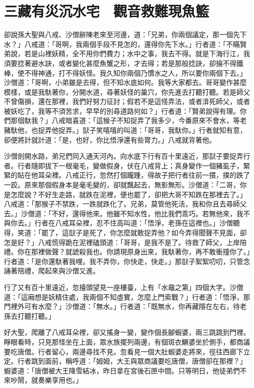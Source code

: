 
\chapter{三藏有災沉水宅　觀音救難現魚籃}

卻說孫大聖與八戒、沙僧辭陳老來至河邊，道：「兄弟，你兩個議定，那一個先下水？」八戒道：「哥啊，我兩個手段不見怎的，還得你先下水。」行者道：「不瞞賢弟說，若是山裡妖精，全不用你們費力；水中之事，我去不得。就是下海行江，我須要捻著避水訣，或者變化甚麼魚蟹之形，才去得；若是那般捻訣，卻掄不得鐵棒，使不得神通，打不得妖怪。我久知你兩個乃慣水之人，所以要你兩個下去。」沙僧道：「哥啊，小弟雖是去得，但不知水底如何。我等大家都去。哥哥變作甚麼模樣，或是我馱著你，分開水道，尋著妖怪的巢穴，你先進去打聽打聽。若是師父不曾傷損，還在那裡，我們好努力征討；假若不是這怪弄法，或者渰死師父，或者被妖吃了，我等不須苦求，早早的別尋道路何如？」行者道：「賢弟說得有理。你們那個馱我？」八戒暗喜道：「這猴子不知捉弄了我多少，今番原來不會水，等老豬馱他，也捉弄他捉弄。」獃子笑嘻嘻的叫道：「哥哥，我馱你。」行者就知有意，卻便將計就計道：「是，也好，你比悟淨還有些膂力。」八戒就背著他。

沙僧剖開水路，弟兄們同入通天河內。向水底下行有百十里遠近，那獃子要捉弄行者。行者隨即拔下一根毫毛，變做假身，伏在八戒背上；真身變作一個豬虱子，緊緊的貼在他耳朵裡。八戒正行，忽然打個躘踵，得故子把行者往前一摜，撲的跌了一跤。原來那個假身本是毫毛變的，卻就飄起去，無影無形。沙僧道：「二哥，你是怎麼說？不好生走路，就跌在泥裡，便也罷了，卻把大哥不知跌在那裡去了。」八戒道：「那猴子不禁跌，一跌就跌化了。兄弟，莫管他死活，我和你且去尋師父去。」沙僧道：「不好，還得他來。他雖不知水性，他比我們乖巧。若無他來，我不與你去。」行者在八戒耳朵裡，忍不住高叫道：「悟淨，老孫在這裡也。」沙僧聽得，笑道：「罷了，這獃子是死了，你怎麼就敢捉弄他？如今弄得聞聲不見面，卻怎是好？」八戒慌得跪在泥裡磕頭道：「哥哥，是我不是了。待救了師父，上岸陪禮。你在那裡做聲？就諕殺我也。你請現原身出來，我馱著你，再不敢衝撞你了。」行者道：「是你還馱著我哩。我不弄你，你快走，快走。」那獃子絮絮叨叨，只管念誦著陪禮，爬起來與沙僧又進。

行了又有百十里遠近，忽擡頭望見一座樓臺，上有「水黿之第」四個大字。沙僧道：「這廂想是妖精住處，我兩個不知虛實，怎麼上門索戰？」行者道：「悟淨，那門裡外可有水麼？」沙僧道：「無水。」行者道：「既無水，你再藏隱在左右，待老孫去打聽打聽。」

好大聖，爬離了八戒耳朵裡，卻又搖身一變，變作個長腳蝦婆，兩三跳跳到門裡。睜眼看時，只見那怪坐在上面，眾水族擺列兩邊，有個斑衣鱖婆坐於側手，都商議要吃唐僧。行者留心，兩邊尋找不見。忽看見一個大肚蝦婆走將來，徑往西廊下立定。行者跳到面前，稱呼道：「姆姆，大王與眾商議要吃唐僧，唐僧卻在那裡？」蝦婆道：「唐僧被大王降雪結冰，昨日拿在宮後石匣中間。只等明日，他徒弟們不來吵鬧，就奏樂享用也。」

